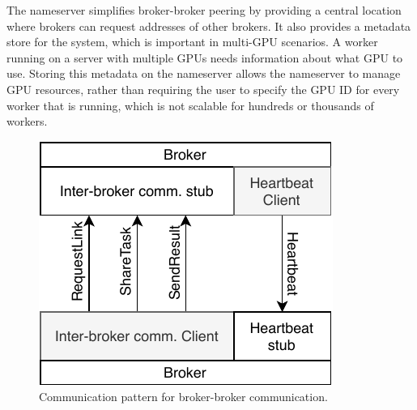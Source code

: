 \documentclass[conference]{IEEEtran}
\begin{document}
The nameserver simplifies broker-broker peering by providing a central location
where brokers can request addresses of other brokers. It also provides a metadata
store for the system, which is important in multi-GPU scenarios. A worker running
on a server with multiple GPUs needs information about what GPU to use. Storing
this metadata on the nameserver allows the nameserver to manage GPU resources,
rather than requiring the user to specify the GPU ID for every worker that is
running, which is not scalable for hundreds or thousands of workers.

% 
% 
\begin{figure}
  \centering
  \includegraphics{img/broker_broker}
  \caption{Communication pattern for broker-broker communication.}
  \label{fig:broker-broker}
\end{figure}
\end{document}
